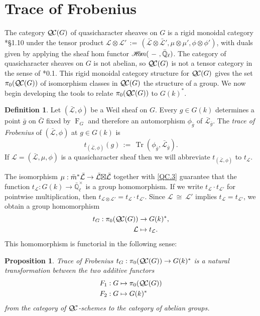 \documentclass{amsart}
\theoremstyle{plain}
\newtheorem{proposition}[theorem]{Proposition}
\theoremstyle{definition}
\newtheorem{definition}[theorem]{Definition}
\theoremstyle{remark}
\newcommand{\EE}{\mathbb{\bar Q}_\ell}
\newcommand{\Fq}{k}
\newcommand{\EEx}{\EE^\times}
\newcommand{\Frob}[1]{\operatorname{F}_{#1}}
\DeclareMathOperator{\trace}{Tr}
\newcommand{\sheafHom}{{\mathscr{H}\hskip-4pt{\it o}\hskip-2pt{\it m}}}
\newcommand{\ceq}{{\, :=\, }}
\newcommand{\iso}{{\ \cong\ }}
\newcommand{\qcs}[1]{{\mathcal{#1}}}
\newcommand{\gqcs}[1]{{\mathcal{\bar #1}}}
\newcommand{\QC}{{\mathcal{Q\hskip-0.8pt C}}}
\newcommand{\QCiso}[1]{\pi_0 (\QC(#1))}
\newcommand{\trFrob}[1]{t_{#1}}
\newcommand{\bg}{\bar{g}}
\newcommand{\bm}{\bar{m}}
\newcommand{\bG}{\bar{G}}
\newcommand{\tight}[3]{\hspace{-#1pt}{#2}\hspace{-#3pt}}
\newcommand{\LxL}{\text{$\gqcs{L} \tight{0}{\boxtimes}{0} \gqcs{L}$}}
\begin{document}
\section{Trace of Frobenius}\label{sec:Frob}

The category $\QC(G)$ of quasicharacter sheaves on $G$ is a rigid monoidal category
\cite{etingof:09a}*{\S1.10} under the tensor product
$\qcs{L} \otimes \qcs{L'} \ceq (\gqcs{L}\otimes\gqcs{L'}, \mu\otimes\mu', \phi\otimes \phi')$,
with duals given by applying the sheaf hom functor 
$\sheafHom(\ - \ ,\EE)$.
The category of quasicharacter sheaves on $G$ is not abelian, so $\QC(G)$
is not a tensor category in the sense of \cite{deligne:02a}*{0.1}.
This rigid monoidal category structure for $\QC(G)$ gives the set $\QCiso{G}$
of isomorphism classes in $\QC(G)$ the structure of a group.
We now begin developing the tools to relate $\QCiso{G}$ to $G(\Fq)^*$.

\begin{definition}\label{def:trFrob}
Let $(\gqcs{L},\phi)$ be a Weil sheaf on $G$. Every $g\in G(\Fq)$
determines a point $\bg$ on $\bG$ fixed by $\Frob{G}$ and
therefore an automorphism $\phi_{\bg}$ of $\gqcs{L}_{\bg}$. The \emph{trace of Frobenius} of $(\gqcs{L},\phi)$ at $g\in G(\Fq)$ is 
\[
\trFrob{(\gqcs{L},\phi)}(g) \ceq \trace(\phi_{\bg}, \gqcs{L}_{\bg}).
\]
If $\qcs{L} = (\gqcs{L},\mu,\phi)$ is a quasicharacter sheaf
then we will abbreviate $\trFrob{(\gqcs{L},\phi)}$ to $\trFrob{\qcs{L}}$.
\end{definition}

The isomorphism $\mu : \bm^* \gqcs{L} \to \LxL$ together with 
\ref{QC.3} guarantee
that the function $\trFrob{\qcs{L}} : G(\Fq)\to \EEx$ is a group homomorphism.  If we write
$\trFrob{\qcs{L}} \cdot \trFrob{\qcs{L'}}$ for pointwise multiplication, then 
 $\trFrob{\qcs{L}\otimes \qcs{L'}} = \trFrob{\qcs{L}} \cdot \trFrob{\qcs{L'}}$.
Since $\qcs{L} \iso \qcs{L'}$ implies $\trFrob{\qcs{L}} = \trFrob{\qcs{L'}}$,
we obtain a group homomorphism
\begin{align*}
\trFrob{G} : \QCiso{G} &\to G(\Fq)^*, \\
\qcs{L} &\mapsto \trFrob{\qcs{L}}.
\end{align*}
This homomorphism is functorial in the following sense:

\begin{proposition}\label{prop:functorialG}
Trace of Frobenius $\trFrob{G} : \QCiso{G} \to G(\Fq)^*$ is a natural transformation 
between the two additive functors 
\begin{align*}
F_1 : G &\mapsto \QCiso{G} \\
F_2 : G &\mapsto G(\Fq)^*
\end{align*}
from the category of $\QC$-schemes to the category of abelian groups.
\end{proposition}
\end{document}
